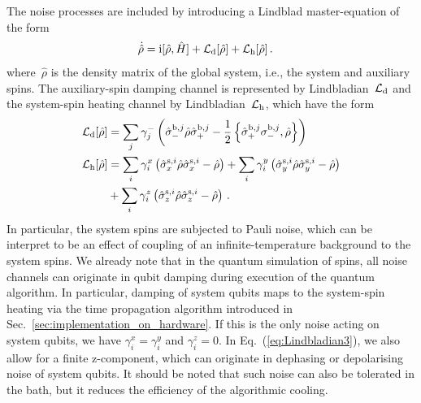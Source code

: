 \documentclass[twocolumn,amsmath,amssymb,pra]{revtex4-2}
\begin{document}
The noise processes are included by introducing a Lindblad master-equation of the form
\begin{align}\label{eq:Lindbladian}
\dot {\hat \rho} &= \textrm{i}[\hat \rho, \hat H] + {\cal L}_\textrm{d}[\hat\rho] + {\cal L}_\textrm{h}[\hat\rho]  \, .
\end{align}
where~$\hat\rho$ is the density matrix of the global system, i.e., the system and auxiliary spins.
The auxiliary-spin damping channel is represented by Lindbladian~${\cal L}_\textrm{d}$ and the system-spin heating channel
by Lindbladian~${\cal L}_\textrm{h}$, which have the form
\begin{align}
{\cal L}_\textrm{d}[\hat\rho] &= \sum_{j}\gamma^-_j\left( \hat \sigma_-^{\textrm{b},j} \hat \rho \hat \sigma_+^{\textrm{b},j} - \frac{1}{2}\left\{\hat \sigma_+^{\textrm{b},j} \sigma_-^{\textrm{b},j} , \hat\rho \right\} \right) \label{eq:Lindbladian2}\\
{\cal L}_\textrm{h}[\hat\rho] &= \sum_{i}\gamma^x_{i}\left( \hat \sigma_x^{\textrm{s},i} \hat \rho \hat \sigma_x^{\textrm{s},i} - \hat\rho \right) + \sum_{i}\gamma^y_{i}\left( \hat \sigma_y^{\textrm{s},i} \hat \rho \hat \sigma_y^{\textrm{s},i} - \hat\rho \right) \nonumber\\
&+ \sum_{i}\gamma^z_{i}\left( \hat \sigma_z^{\textrm{s},i} \hat \rho \hat \sigma_z^{\textrm{s},i} - \hat\rho \right)  \label{eq:Lindbladian3}\, .
\end{align}
In particular, the system spins are subjected to Pauli noise, 
which can be interpret to be an effect of coupling of an infinite-temperature background to the system spins. 
We already note that in the quantum simulation of spins,
all noise channels can originate in qubit damping during execution of the quantum algorithm. 
In particular, damping of system qubits maps to the system-spin heating via the time propagation algorithm 
introduced in Sec.~\ref{sec:implementation_on_hardware}. 
If this is the only noise acting on system qubits, we have $\gamma^x_{i}=\gamma^y_{i}$ and $\gamma^z_{i}=0$. 
In Eq.~(\ref{eq:Lindbladian3}), we also allow for a finite z-component,
which can originate in dephasing or depolarising noise of system qubits. 
It should be noted that such noise can also be tolerated in the bath, 
but it reduces the efficiency of the algorithmic cooling. 
\end{document}
